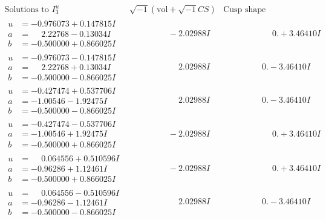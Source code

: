 \documentclass[1p]{elsarticle_modified}
\theoremstyle{definition}
\newcommand{\I}{\sqrt{-1}}
\begin{document}
$$\begin{array}{c|c|c}  
\text{Solutions to }I^u_{3}& \I (\text{vol} + \sqrt{-1}CS) & \text{Cusp shape}\\
 \hline 
\begin{aligned}
u &= -0.976073 + 0.147815 I \\
a &= \phantom{-}2.22768 - 0.13034 I \\
b &= -0.500000 + 0.866025 I\end{aligned}
 & \phantom{-0.000000 } -2.02988 I & \phantom{-0.000000 -}0. + 3.46410 I \\ \hline\begin{aligned}
u &= -0.976073 - 0.147815 I \\
a &= \phantom{-}2.22768 + 0.13034 I \\
b &= -0.500000 - 0.866025 I\end{aligned}
 & \phantom{-0.000000 -}2.02988 I & \phantom{-0.000000 } 0. - 3.46410 I \\ \hline\begin{aligned}
u &= -0.427474 + 0.537706 I \\
a &= -1.00546 - 1.92475 I \\
b &= -0.500000 - 0.866025 I\end{aligned}
 & \phantom{-0.000000 -}2.02988 I & \phantom{-0.000000 } 0. - 3.46410 I \\ \hline\begin{aligned}
u &= -0.427474 - 0.537706 I \\
a &= -1.00546 + 1.92475 I \\
b &= -0.500000 + 0.866025 I\end{aligned}
 & \phantom{-0.000000 } -2.02988 I & \phantom{-0.000000 -}0. + 3.46410 I \\ \hline\begin{aligned}
u &= \phantom{-}0.064556 + 0.510596 I \\
a &= -0.96286 + 1.12461 I \\
b &= -0.500000 + 0.866025 I\end{aligned}
 & \phantom{-0.000000 } -2.02988 I & \phantom{-0.000000 -}0. + 3.46410 I \\ \hline\begin{aligned}
u &= \phantom{-}0.064556 - 0.510596 I \\
a &= -0.96286 - 1.12461 I \\
b &= -0.500000 - 0.866025 I\end{aligned}
 & \phantom{-0.000000 -}2.02988 I & \phantom{-0.000000 } 0. - 3.46410 I \\ \hline\begin{aligned}

\end{aligned}
\end{array}$$
\end{document}
